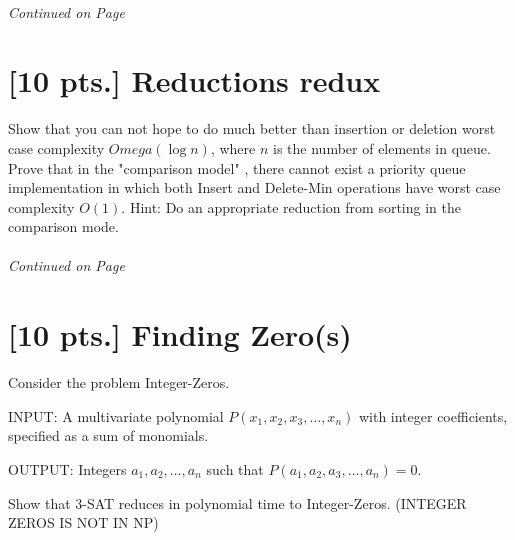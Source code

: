 \documentclass[11pt]{article}
\begin{document}
\label{pg:end-of-p1}
%
\paragraph{} \emph{Continued on Page \pageref{pg:p1-continuation}}

\newpage

\pagestyle{plain}

\section{[10 pts.] Reductions redux}

Show that you can not hope to do much better than insertion 
or deletion worst case complexity $Omega(\log n)$, where $n$ is the 
number of elements in queue. Prove that in the "comparison model"
, there cannot exist a priority queue implementation in which
both Insert and Delete-Min operations have worst case complexity $O(1)$. 
Hint: Do an appropriate reduction from sorting in the comparison mode. 
 
\label{pg:end-of-p2}
%
\paragraph{} \emph{Continued on Page \pageref{pg:p2-continuation}}

\newpage

\section{[10 pts.] Finding Zero(s)} 

Consider the problem Integer-Zeros. 

INPUT: A multivariate polynomial $P(x_1,x_2,x_3,\ldots,x_n)$ with integer
coefficients, specified as a sum of monomials. 

OUTPUT: Integers $a_1,a_2,\ldots,a_n$ such that $P(a_1,a_2,a_3,\ldots,a_n)=0$.

Show that 3-SAT reduces in polynomial time to Integer-Zeros. (INTEGER ZEROS
IS NOT IN NP)   
  
\end{document}
